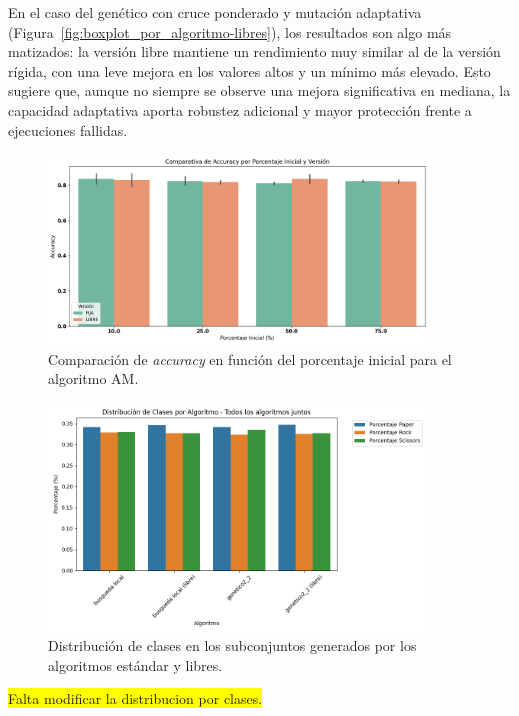 En el caso del genético con cruce ponderado y mutación adaptativa (Figura~\ref{fig:boxplot_por_algoritmo-libres}),
los resultados son algo más matizados: la versión libre mantiene un rendimiento muy similar al de la versión rígida,
con una leve mejora en los valores altos y un mínimo más elevado.
Esto sugiere que, aunque no siempre se observe una mejora significativa en mediana,
la capacidad adaptativa aporta robustez adicional y mayor protección frente a ejecuciones fallidas.


\begin{figure}[htp]
    \centering
    \includegraphics[width=0.9\textwidth]{imagenes/evaluaciones/libres/am_por_pi}
    \caption{Comparación de \textit{accuracy} en función del porcentaje inicial para el algoritmo AM.}
    \label{fig:am_por_pi}
\end{figure}


\begin{figure}[htp]
    \centering
    \includegraphics[width=0.9\textwidth]{imagenes/evaluaciones/libres/distribucion-clases}
    \caption{Distribución de clases en los subconjuntos generados por los algoritmos estándar y libres.}
    \label{fig:distribucion_libres}
\end{figure}

\colorbox{yellow}{Falta modificar la distribucion por clases.}

